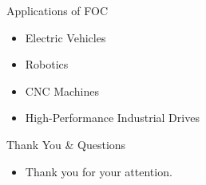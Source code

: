 \documentclass{beamer}
\begin{document}
\begin{frame}{Applications of FOC}
  \begin{itemize}
    \item Electric Vehicles
    \item Robotics
    \item CNC Machines
    \item High-Performance Industrial Drives
  \end{itemize}
\end{frame}

\begin{frame}{Thank You \& Questions}
    \begin{itemize}
        \item Thank you for your attention.
    \end{itemize}
\end{frame}
\end{document}
